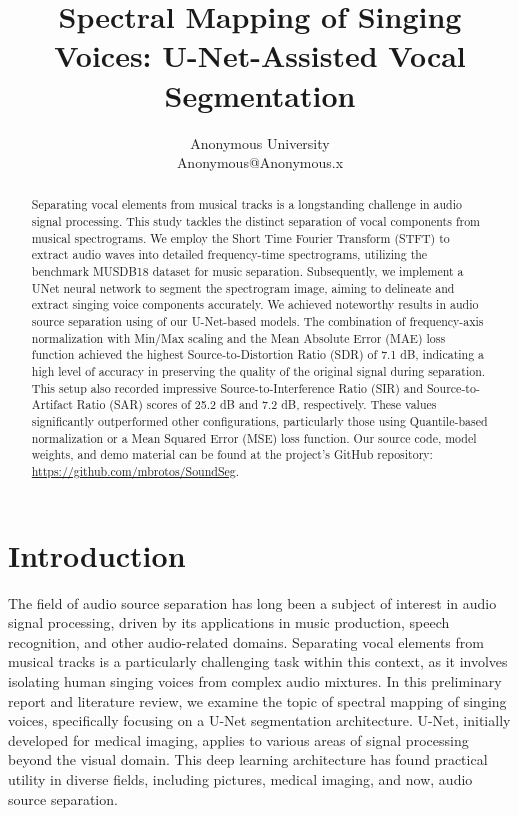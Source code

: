 \documentclass[conference]{IEEEtran}
\begin{document}
\title{Spectral Mapping of Singing Voices: U-Net-Assisted Vocal Segmentation}

\author{
    Anonymous University\\
    Anonymous@Anonymous.x
}

\maketitle

\begin{abstract}
Separating vocal elements from musical tracks is a longstanding challenge in audio signal processing. This study tackles the distinct separation of vocal components from musical spectrograms. We employ the Short Time Fourier Transform (STFT) to extract audio waves into detailed frequency-time spectrograms, utilizing the benchmark MUSDB18 dataset for music separation. Subsequently, we implement a UNet neural network to segment the spectrogram image, aiming to delineate and extract singing voice components accurately. We achieved noteworthy results in audio source separation using of our U-Net-based models. The combination of frequency-axis normalization with Min/Max scaling and the Mean Absolute Error (MAE) loss function achieved the highest Source-to-Distortion Ratio (SDR) of 7.1 dB, indicating a high level of accuracy in preserving the quality of the original signal during separation. This setup also recorded impressive Source-to-Interference Ratio (SIR) and Source-to-Artifact Ratio (SAR) scores of 25.2 dB and 7.2 dB, respectively. These values significantly outperformed other configurations, particularly those using Quantile-based normalization or a Mean Squared Error (MSE) loss function. Our source code, model weights, and demo material can be found at the project's GitHub repository: \url{https://github.com/mbrotos/SoundSeg}.
\end{abstract}

\IEEEpeerreviewmaketitle



\section{Introduction}

The field of audio source separation has long been a subject of interest in audio signal processing, driven by its applications in music production, speech recognition, and other audio-related domains. Separating vocal elements from musical tracks is a particularly challenging task within this context, as it involves isolating human singing voices from complex audio mixtures. In this preliminary report and literature review, we examine the topic of spectral mapping of singing voices, specifically focusing on a U-Net \cite{ronneberger2015unet} segmentation architecture. U-Net, initially developed for medical imaging, applies to various areas of signal processing beyond the visual domain. This deep learning architecture has found practical utility in diverse fields, including pictures, medical imaging, and now, audio source separation.
\end{document}
